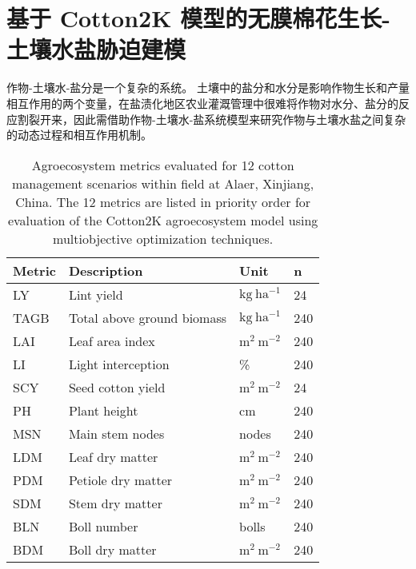 \chapter{基于 Cotton2K 模型的无膜棉花生长-土壤水盐胁迫建模}
作物-土壤水-盐分是一个复杂的系统。
土壤中的盐分和水分是影响作物生长和产量相互作用的两个变量，在盐渍化地区农业灌溉管理中很难将作物对水分、盐分的反应割裂开来，因此需借助作物-土壤水-盐系统模型来研究作物与土壤水盐之间复杂的动态过程和相互作用机制。
\begin{table}
    \caption{Agroecosystem metrics evaluated for 12 cotton management scenarios within field at Alaer, Xinjiang, China.
        The 12 metrics are listed in priority order for evaluation of the Cotton2K agroecosystem model using multiobjective optimization techniques.}
    \centering
    \begin{tabular}{llll}
        \toprule
        Metric & Description                & Unit                   & n   \\
        \midrule
        LY     & Lint yield                 & $\mathrm{kg\ ha^{-1}}$ & 24  \\
        TAGB   & Total above ground biomass & $\mathrm{kg\ ha^{-1}}$ & 240 \\
        LAI    & Leaf area index            & $\mathrm{m^2\ m^{-2}}$ & 240 \\
        LI     & Light interception         & \%                     & 240 \\
        SCY    & Seed cotton yield          & $\mathrm{m^2\ m^{-2}}$ & 24  \\
        PH     & Plant height               & cm                     & 240 \\
        MSN    & Main stem nodes            & nodes                  & 240 \\
        LDM    & Leaf dry matter            & $\mathrm{m^2\ m^{-2}}$ & 240 \\
        PDM    & Petiole dry matter         & $\mathrm{m^2\ m^{-2}}$ & 240 \\
        SDM    & Stem dry matter            & $\mathrm{m^2\ m^{-2}}$ & 240 \\
        BLN    & Boll number                & bolls                  & 240 \\
        BDM    & Boll dry matter            & $\mathrm{m^2\ m^{-2}}$ & 240 \\
        \bottomrule
    \end{tabular}
\end{table}

